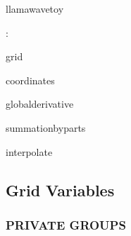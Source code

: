 \documentclass{article}
\begin{document}
llamawavetoy
\vspace{2mm}

: 

grid

coordinates

globalderivative

summationbyparts

interpolate
\vspace{2mm}
\subsection*{Grid Variables}
\vspace{5mm}\subsubsection{PRIVATE GROUPS}

\vspace{5mm}
\end{document}
